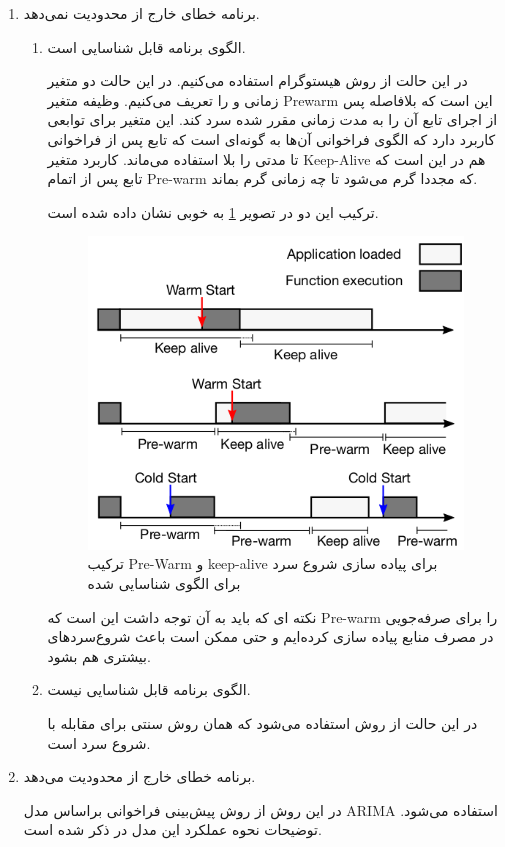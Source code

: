 \begin{enumerate}
	\item برنامه خطای خارج از محدودیت نمی‌دهد.
	
	\begin{enumerate}
		\item الگوی برنامه قابل شناسایی است.
		
		در این حالت از روش هیستوگرام استفاده می‌کنیم. در این حالت دو متغیر زمانی  و  را تعریف می‌کنیم. وظیفه متغیر Prewarm این است که بلافاصله پس از اجرای تابع آن را به مدت زمانی مقرر شده سرد کند. این متغیر برای توابعی کاربرد دارد که الگوی فراخوانی آن‌ها به گونه‌ای است که تابع پس از فراخوانی تا مدتی را بلا استفاده می‌ماند. کاربرد متغیر Keep-Alive هم در این است که تابع پس از اتمام Pre-warm که مجددا گرم می‌شود تا چه زمانی گرم بماند. 
		
		ترکیب این دو در تصویر \ref{fig:Azure-Prewarm-keepalive-composition} به خوبی نشان داده شده است. 
		
		\begin{figure}
			\centering
			\includegraphics[width=0.7\linewidth]{figs/Azure-Prewarm-keepalive-composition}
			\caption {ترکیب Pre-Warm و keep-alive برای پیاده سازی شروع سرد برای الگوی شناسایی شده}
			\label{fig:Azure-Prewarm-keepalive-composition}
		\end{figure}
		
		نکته ای که باید به آن توجه داشت این است که Pre-warm را برای صرفه‌جویی در مصرف منابع پیاده سازی کرده‌ایم و  حتی ممکن است باعث شروع‌سردهای بیشتری هم بشود. 
		
		\item الگوی برنامه قابل شناسایی نیست.
		
		در این حالت از روش  استفاده می‌شود که همان روش سنتی برای مقابله با شروع سرد است. 
		
	\end{enumerate}
		
	\item برنامه خطای خارج از محدودیت می‌دهد.
	
	در این روش از روش پیش‌بینی فراخوانی براساس مدل ARIMA استفاده می‌شود. توضیحات نحوه عملکرد این مدل در \cite{ARIMA} ذکر شده است. 
\end{enumerate}

